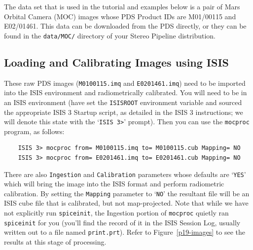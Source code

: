 The data set that is used in the tutorial and examples below is a
pair of Mars Orbital Camera (\ac{MOC}) \citep{1992JGR....97.7699M,2001JGR...10623429M}
images whose \ac{PDS} Product IDs are M01/00115 and E02/01461.
This data can be downloaded from the PDS directly, or they can be
found in the \texttt{data/MOC/} directory of your Stereo Pipeline distribution.

\subsection{Loading and Calibrating Images using ISIS}

These raw \ac{PDS} images (\texttt{M0100115.imq} and \texttt{E0201461.imq})
need to be imported into the \ac{ISIS} environment and radiometrically
calibrated.  You will need to be in an \ac{ISIS} environment (have
set the \texttt{ISISROOT} environment variable and sourced the
appropriate \ac{ISIS} 3 Startup script, as detailed in the \ac{ISIS}
3 instructions; we will denote this state with the `\texttt{ISIS
3>}' prompt).  Then you can use the \texttt{mocproc} program, as follows:

\begin{verbatim}
    ISIS 3> mocproc from= M0100115.imq to= M0100115.cub Mapping= NO
    ISIS 3> mocproc from= E0201461.imq to= E0201461.cub Mapping= NO
\end{verbatim}

There are also \texttt{Ingestion} and \texttt{Calibration} parameters
whose defaults are `\texttt{YES}' which will bring the image into the
\ac{ISIS} format and perform radiometric calibration.  By setting the
\texttt{Mapping} parameter to `\texttt{NO}' the resultant file will be
an \ac{ISIS} cube file that is calibrated, but not map-projected.
Note that while we have not explicitly run \texttt{spiceinit}, the
Ingestion portion of \texttt{mocproc} quietly ran \texttt{spiceinit}
for you (you'll find the record of it in the \ac{ISIS} Session Log,
usually written out to a file named \texttt{print.prt}).  Refer to
Figure~\ref{p19-images} to see the results at this stage of
processing.

